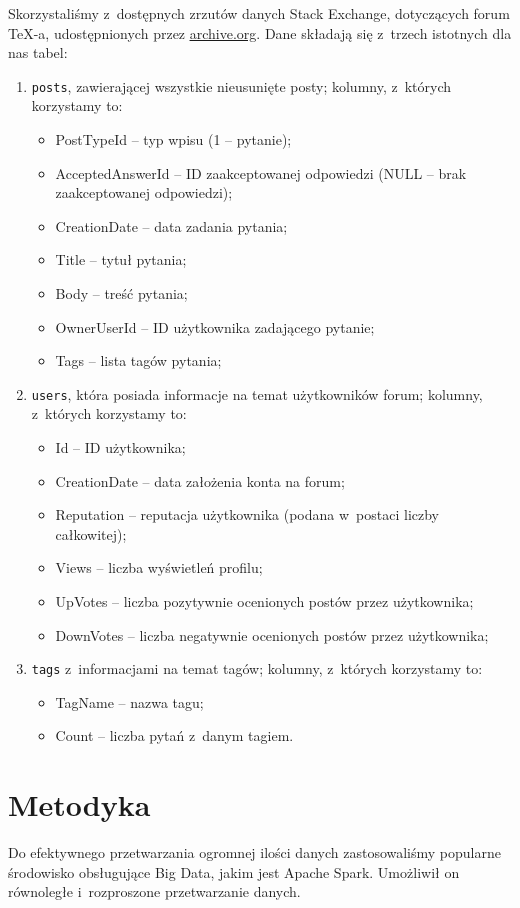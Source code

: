 \documentclass[12pt]{article}
\begin{document}
	Skorzystaliśmy z~dostępnych zrzutów danych Stack Exchange, dotyczących forum \TeX-a, udostępnionych przez \underline{\href{https://archive.org/details/stackexchange}{archive.org}}. Dane składają się z~trzech istotnych dla nas tabel:
	\begin{enumerate}
		\item \verb|posts|, zawierającej wszystkie nieusunięte posty; kolumny, z~których korzystamy to:
		\begin{itemize}
			\item PostTypeId -- typ wpisu (1 -- pytanie);
			\item AcceptedAnswerId -- ID zaakceptowanej odpowiedzi (NULL -- brak zaakceptowanej odpowiedzi); 
			\item CreationDate -- data zadania pytania;
			\item Title -- tytuł pytania;
			\item Body -- treść pytania;
			\item OwnerUserId -- ID użytkownika zadającego pytanie;
			\item Tags -- lista tagów pytania;
		\end{itemize}
		\item \verb|users|, która posiada informacje na temat użytkowników forum; kolumny, z~których korzystamy to:
		\begin{itemize}
			\item Id -- ID użytkownika;
			\item CreationDate -- data założenia konta na forum;
			\item Reputation -- reputacja użytkownika (podana w~postaci liczby całkowitej);
			\item Views -- liczba wyświetleń profilu;
			\item UpVotes -- liczba pozytywnie ocenionych postów przez użytkownika;
			\item DownVotes -- liczba negatywnie ocenionych postów przez użytkownika;
		\end{itemize}
		\item \verb|tags| z~informacjami na temat tagów; kolumny, z~których korzystamy to:
		\begin{itemize}
			\item TagName -- nazwa tagu;
			\item Count -- liczba pytań z~danym tagiem.
		\end{itemize}
	\end{enumerate}
	
	\section{Metodyka}\label{sec:metodyka}
	Do efektywnego przetwarzania ogromnej ilości danych zastosowaliśmy popularne środowisko obsługujące Big Data, jakim jest Apache Spark. Umożliwił on równoległe i~rozproszone przetwarzanie danych.
	
\end{document}
